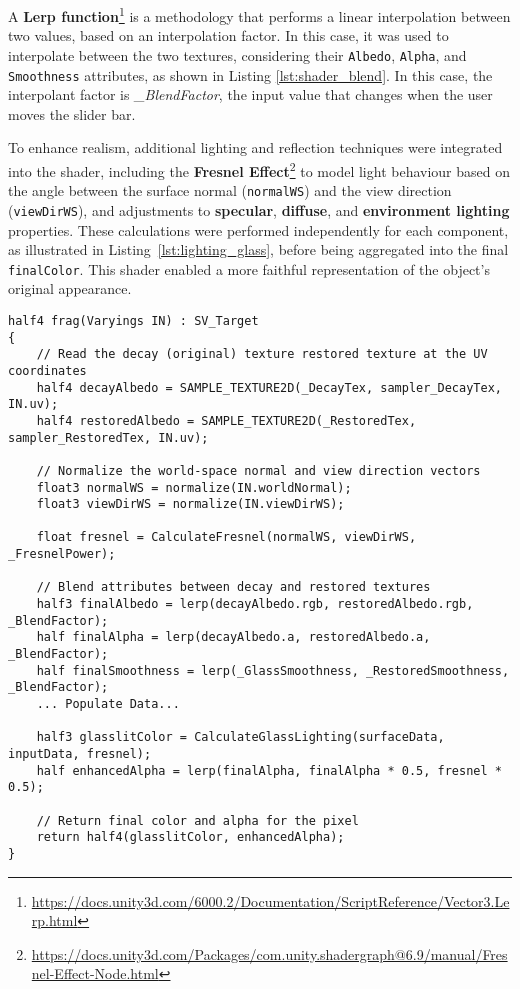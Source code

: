 A \textbf{Lerp function}\footnote{\url{https://docs.unity3d.com/6000.2/Documentation/ScriptReference/Vector3.Lerp.html}} is a methodology that performs a linear interpolation between two values, based on an interpolation factor.
In this case, it was used to interpolate between the two textures, considering their \texttt{Albedo}, \texttt{Alpha}, and \texttt{Smoothness} attributes, as shown in Listing \ref{lst:shader_blend}. 
In this case, the interpolant factor is \emph{\_BlendFactor}, the input value that changes when the user moves the slider bar.

To enhance realism, additional lighting and reflection techniques were integrated into the shader, including 
the \textbf{Fresnel Effect}\footnote{\url{https://docs.unity3d.com/Packages/com.unity.shadergraph@6.9/manual/Fresnel-Effect-Node.html}} to model light behaviour based on the angle between the surface normal (\texttt{normalWS}) and the view direction (\texttt{viewDirWS}), 
and adjustments to \textbf{specular}, \textbf{diffuse}, and \textbf{environment lighting} properties. 
These calculations were performed independently for each component, as illustrated in Listing~\ref{lst:lighting_glass}, before being aggregated into the final \texttt{finalColor}. 
This shader enabled a more faithful representation of the object's original appearance.

\begin{lstlisting}[language=HLSL, caption={Partial Fragment shader for blending original and restored textures.}, label={lst:shader_blend},float]
half4 frag(Varyings IN) : SV_Target
{
    // Read the decay (original) texture restored texture at the UV coordinates
    half4 decayAlbedo = SAMPLE_TEXTURE2D(_DecayTex, sampler_DecayTex, IN.uv);
    half4 restoredAlbedo = SAMPLE_TEXTURE2D(_RestoredTex, sampler_RestoredTex, IN.uv);

    // Normalize the world-space normal and view direction vectors
    float3 normalWS = normalize(IN.worldNormal);
    float3 viewDirWS = normalize(IN.viewDirWS);

    float fresnel = CalculateFresnel(normalWS, viewDirWS, _FresnelPower);

    // Blend attributes between decay and restored textures
    half3 finalAlbedo = lerp(decayAlbedo.rgb, restoredAlbedo.rgb, _BlendFactor);
    half finalAlpha = lerp(decayAlbedo.a, restoredAlbedo.a, _BlendFactor);
    half finalSmoothness = lerp(_GlassSmoothness, _RestoredSmoothness, _BlendFactor);
    ... Populate Data...
    
    half3 glasslitColor = CalculateGlassLighting(surfaceData, inputData, fresnel);            
    half enhancedAlpha = lerp(finalAlpha, finalAlpha * 0.5, fresnel * 0.5);
    
    // Return final color and alpha for the pixel
    return half4(glasslitColor, enhancedAlpha); 
}
\end{lstlisting}


